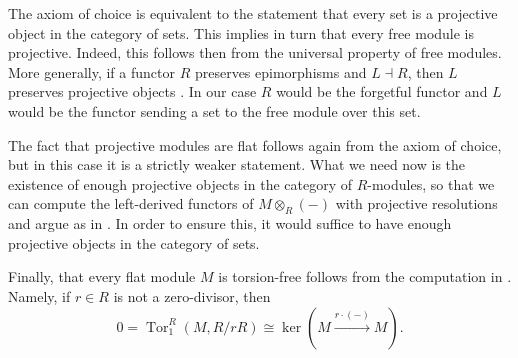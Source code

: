 \documentclass[A4paper, 12pt, british, reqno]{amsart}
\theoremstyle{plain}
\theoremstyle{definition}
\theoremstyle{remark}
\theoremstyle{plain}
\theoremstyle{definition}
\theoremstyle{remark}
\theoremstyle{plain}
\theoremstyle{definition}
\theoremstyle{remark}
\newcommand\tikzmark[1]{%
\tikz[remember picture,overlay] \node[inner xsep=0pt] (#1) {};
}
\DeclareMathOperator{\Tor}{Tor}
\newcommand{\ot}{\otimes}
\begin{document}
\begin{center}
\end{center}

The axiom of choice is equivalent to the statement that every set is a projective object in the category of sets.
This implies in turn that every free module is projective.
Indeed, this follows then from the universal property of free modules.
More generally, if a functor $R$ preserves epimorphisms and $L\dashv R$, then $L$ preserves projective objects \cite[Dual of Fact 1.1.1]{fra18}.
In our case $R$ would be the forgetful functor and $L$ would be the functor sending a set to the free module over this set.

The fact that projective modules are flat follows again from the axiom of choice, but in this case it is a strictly weaker statement.
What we need now is the existence of enough projective objects in the category of $R$-modules, so that we can compute the left-derived functors of $M\ot_{R}(-)$ with projective resolutions and argue as in \cite[Fact 1.2.1]{fra18}.
In order to ensure this, it would suffice to have enough projective objects in the category of sets.

Finally, that every flat module $M$ is torsion-free follows from the computation in \cite[Example 1.2.1]{fra18}.
Namely, if $r\in R$ is not a zero-divisor, then
\[ 0=\Tor^{R}_{1}(M,R/rR)\cong \ker(M\xrightarrow{r\cdot (-)}M). \]
\end{document}
